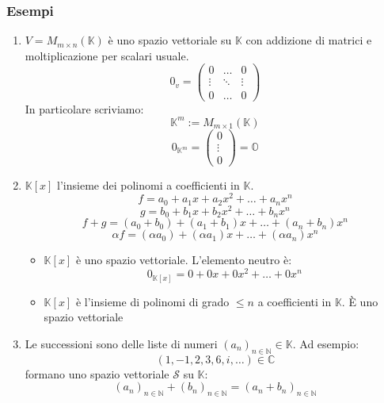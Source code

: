 \documentclass[a4paper]{article}
\theoremstyle{break}
\theoremstyle{break}
\theoremstyle{break}
\theoremstyle{break}
\begin{document}
  \subsubsection{Esempi}
  \begin{enumerate}
    \item 
      \( V = M_{m \times n}(\mathbb{K}) \) è uno spazio vettoriale su \( \mathbb{K} \) con
      addizione di matrici e moltiplicazione per scalari usuale.
      \[
        0_v = \begin{pmatrix} 
          0 & \ldots & 0\\
          \vdots & \ddots & \vdots\\
          0 & \ldots & 0
        \end{pmatrix}
      \] 
      In particolare scriviamo:
      \[
        \mathbb{K}^m := M_{m \times 1}(\mathbb{K})
      \] 
      \[
        0_{\mathbb{K}^m}
        = \begin{pmatrix}
          0\\
          \vdots\\
          0
        \end{pmatrix}
        = \mathbb{O}
      \] 
    \item \( \mathbb{K}[x] \) l'insieme dei polinomi a coefficienti in \( \mathbb{K} \).
      \[
      f = a_0 + a_1x + a_2x^2 + \ldots + a_nx^n
      \] 
      \[
      g = b_0 + b_1x + b_2x^2 + \ldots + b_nx^n
      \] 
      \vspace{1em}
      \[
      f+g = (a_0+b_0) + (a_1+b_1)x + \ldots + (a_n+b_n)x^n
      \] 
      \[
      \alpha f = (\alpha a_0) + (\alpha a_1)x + \ldots + (\alpha a_n)x^n
      \] 
      \begin{itemize}
        \item 
          \( \mathbb{K}[x] \) è uno spazio vettoriale. L'elemento neutro è:
          \[
            0_{\mathbb{K}[x]} = 0 + 0x + 0x^2 + \ldots + 0x^n
          \] 
        \item 
          \( \mathbb{K}[x] \) è l'insieme di polinomi di grado \( \le n \) a coefficienti
          in \( \mathbb{K} \). È uno spazio vettoriale
      \end{itemize}
    \item Le successioni sono delle liste di numeri \( (a_n)_{n \in \mathbb{N}} \in \mathbb{K} \). Ad
      esempio:
      \[
        (1,-1,2,3,6,i, \ldots) \in \mathbb{C}
      \] 
      formano uno spazio vettoriale \( \mathcal{S} \) su \( \mathbb{K} \):
      \[
        (a_n)_{n \in \mathbb{N}} + (b_n)_{n \in \mathbb{N}} = (a_n+b_n)_{n \in \mathbb{N}}
\]
\end{enumerate}
\end{document}
